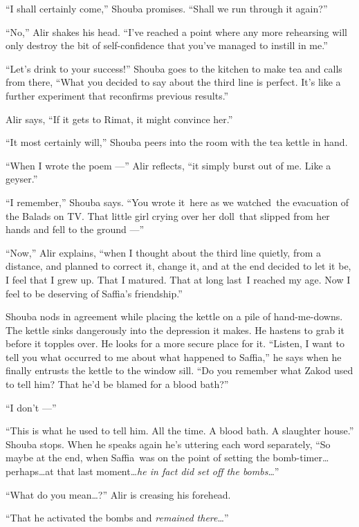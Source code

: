 \documentclass[twoside,11pt]{book}
\begin{document}
``I shall certainly come,'' Shouba promises. ``Shall we run through it
again?''

``No,'' Alir shakes his head. ``I've reached a point where any
more rehearsing will only destroy the bit of self-confidence that you've managed to instill in me.''

``Let's drink to your success!'' Shouba goes to the kitchen to make tea and calls from there,
``What you decided to say about the third line is perfect. It's like a further experiment that reconfirms
previous results.''

Alir says, ``If it gets to Rimat, it might convince her.''

``It most certainly will,'' Shouba peers into the room with the tea kettle in hand.

``When I wrote the poem ---'' Alir reflects, ``it simply burst out of me. Like a geyser.''

``I remember,'' Shouba says. ``You wrote it~here as we watched~the evacuation of
the Balads on TV. That little girl crying over her doll~that slipped from her hands and fell to the ground ---''

``Now,'' Alir explains, ``when I thought about the third line quietly, from a
distance, and planned to correct it, change it, and at the end decided to let it be, I feel that I grew up. That I
matured. That at long last~I reached my age. Now I feel to be deserving of Saffia's friendship.''

Shouba nods in agreement while placing the kettle on a pile of hand-me-downs. The kettle sinks dangerously into the
depression it makes. He hastens to grab it before it topples over. He looks for a more secure place for it.
``Listen, I want to tell you what occurred to me about what happened to Saffia,'' he says
when he finally entrusts the kettle to the window sill. ``Do you remember what Zakod used to tell him?
That he'd be blamed for a blood bath?''

``I don't ---''

``This is what he used to tell him. All the time. A blood bath. A slaughter house.'' Shouba
stops. When he speaks again he's uttering each word separately, ``So maybe at the end, when Saffia~was
on the point of setting the bomb-timer{\ldots}perhaps{\ldots}at that last moment{\ldots}\textit{he in fact did set off
the bombs}{\ldots}''

``What do you mean{\ldots}?'' Alir is creasing his forehead.

``That he activated the bombs and \textit{remained there}{\ldots}''
\end{document}
